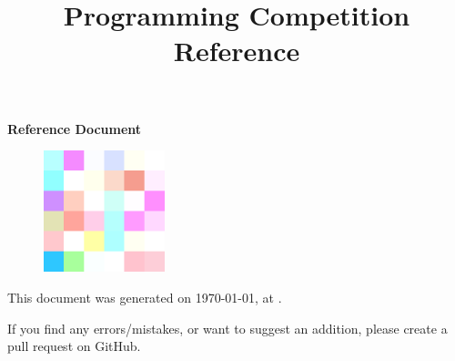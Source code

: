 \documentclass[dvipsnames]{article}
\title{Programming Competition Reference}
\begin{document}

\setlength{\abovedisplayskip}{0pt}
\setlength{\belowdisplayskip}{0pt}
\setlength{\abovedisplayshortskip}{0pt}
\setlength{\belowdisplayshortskip}{0pt}


\setlength{\columnseprule}{1pt}
\setlength{\columnsep}{0.5cm}
\def\columnseprulecolor{\color{gray}}

\begin{multicols}{2}

{\hspace{1pt}}


\begin{center}

    {\bfseries \fontsize{19}{23}\selectfont Reference Document}
    
    \vspace{0pt}
    
    \textit{}

    \begin{figure}[H]
    \centering
    \includegraphics[width=100pt]{logo.png}
    \label{fig:logo}
\end{figure}
\end{center}


\makeatletter
\renewcommand\tableofcontents{
    \@starttoc{toc}
}
\makeatother
{}
\setcounter{tocdepth}{2}
{\tableofcontents}




\end{multicols}


{\color{gray}\centering

This document was generated on \today, at \currenttime.

If you find any errors/mistakes, or want to suggest an addition, please create a pull request on GitHub.

}

\label{LastPage}
\end{document}
